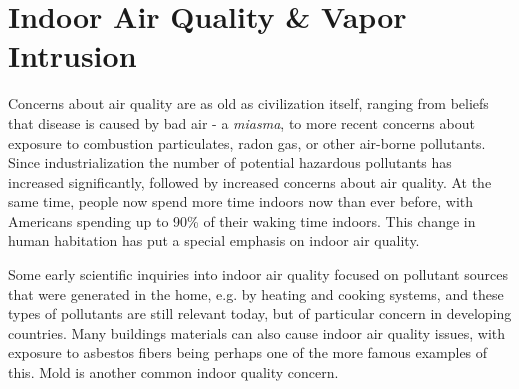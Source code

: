 \begin{comment}
Points to make:

- Some broad history/background on indoor air quality concerns.


- Radon intrusion
-- Explain what it is
-- Prevalence
-- Lung cancer risk

- Vapor intrusion introduction
-- Explain what it is
-- Prevalence (superfund sites etc)
\end{comment}

\section{Indoor Air Quality \& Vapor Intrusion}
Concerns about air quality are as old as civilization itself, ranging from beliefs that disease is caused by bad air - a \textit{miasma}, to more recent concerns about exposure to combustion particulates, radon gas, or other air-borne pollutants.
Since industrialization the number of potential hazardous pollutants has increased significantly, followed by increased concerns about air quality.
At the same time, people now spend more time indoors now than ever before, with Americans spending up to 90\% of their waking time indoors\cite{klepeis_national_2001}.
This change in human habitation has put a special emphasis on indoor air quality.\par

Some early scientific inquiries into indoor air quality focused on pollutant sources that were generated in the home, e.g. by heating and cooking systems, and these types of pollutants are still relevant today, but of particular concern in developing countries\cite{craig_d._hollowell_combustion-generated_1976,world_health_organisation_who_2014}.
Many buildings materials can also cause indoor air quality issues, with exposure to asbestos fibers being perhaps one of the more famous examples of this.
Mold is another common indoor quality concern\cite{world_health_organisation_who_2009}.\par

